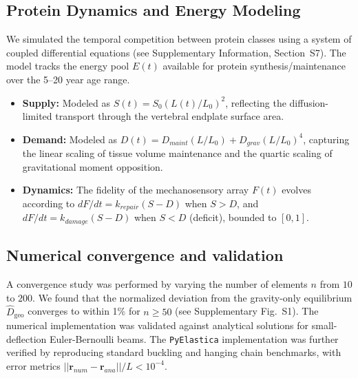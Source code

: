 \subsection{Protein Dynamics and Energy Modeling}

We simulated the temporal competition between protein classes using a system of coupled differential equations (see Supplementary Information, Section~S7). The model tracks the energy pool $E(t)$ available for protein synthesis/maintenance over the 5--20 year age range.
\begin{itemize}
    \item \textbf{Supply:} Modeled as $S(t) = S_0 (L(t)/L_0)^2$, reflecting the diffusion-limited transport through the vertebral endplate surface area.
    \item \textbf{Demand:} Modeled as $D(t) = D_{maint} (L/L_0) + D_{grav} (L/L_0)^4$, capturing the linear scaling of tissue volume maintenance and the quartic scaling of gravitational moment opposition.
    \item \textbf{Dynamics:} The fidelity of the mechanosensory array $F(t)$ evolves according to $dF/dt = k_{repair}(S - D)$ when $S > D$, and $dF/dt = k_{damage}(S - D)$ when $S < D$ (deficit), bounded to $[0, 1]$.
\end{itemize}

\subsection{Numerical convergence and validation}

A convergence study was performed by varying the number of elements $n$ from $10$ to $200$. We found that the normalized deviation from the gravity-only equilibrium $\widehat{D}_{\mathrm{geo}}$ converges to within 1\% for $n \geq 50$ (see Supplementary Fig.~S1). The numerical implementation was validated against analytical solutions for small-deflection Euler-Bernoulli beams. The \texttt{PyElastica} implementation was further verified by reproducing standard buckling and hanging chain benchmarks, with error metrics $||\mathbf{r}_{num} - \mathbf{r}_{ana}||/L < 10^{-4}$.
